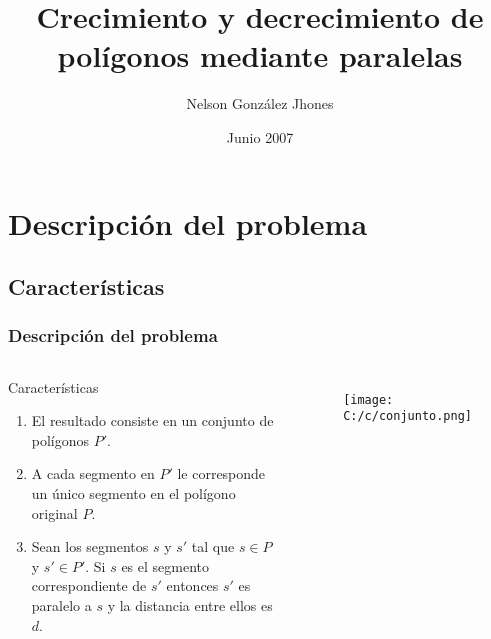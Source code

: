 \documentclass[notes=show]{beamer}
\newtheorem{claim}{Caracter\'isticas}[section]
\begin{document}
\title[Crecimiento y decrecimiento de pol\'igonos]{Crecimiento y
decrecimiento de pol\'igonos mediante paralelas}
\author[Jhones]{Nelson Gonz\'alez Jhones}
\date[06/07]{Junio 2007}
\maketitle

\section{Descripci\'{o}n del problema}

\subsection{Caracter\'isticas}

\begin{frame}
\frametitle{Descripci\'{o}n del problema}

\begin{columns}[6cm]

\column{7cm}

\begin{block}{Caracter\'isticas}
\begin{enumerate}
\item<1-| alert@1> \textnormal{\small{El resultado consiste en un conjunto de pol\'igonos $P'$.}}
\item<2-| alert@2>  \textnormal{\small{A cada segmento en $P'$ le corresponde un \'unico segmento en el pol\'igono original $P$.}}
\item<3-| alert@3> \textnormal{\small{Sean los segmentos $s$ y $s'$ tal que $s \in P$ y $s' \in P'$}. Si $s$ es el segmento correspondiente de $s'$ entonces $s'$ es paralelo a $s$ y la distancia entre ellos es $d$. }
\qedhere

%
\end{enumerate}
\end{block}



\column{5cm}

\begin{figure}[htbp]
	\centering
		\texttt{[image: C:/c/conjunto.png]}
	\label{fig:corte1}
\end{figure}


\end{columns}
\end{frame}
\end{document}
